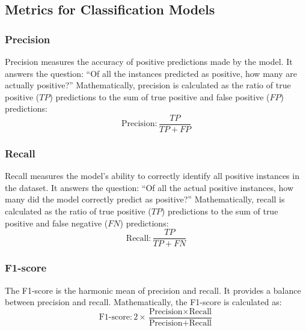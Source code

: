 \subsection{Metrics for Classification Models}

\subsubsection{Precision}
Precision measures the accuracy of positive predictions made by the model. It answers the question: ``Of all the instances predicted as positive, how many are actually positive?'' Mathematically, precision is calculated as the ratio of true positive (\(TP\)) predictions to the sum of true positive and false positive (\(FP\)) predictions:
\[
\text{Precision}:  \frac{TP}{TP + FP}
\]

\subsubsection{Recall}
Recall measures the model's ability to correctly identify all positive instances in the dataset. It answers the question: ``Of all the actual positive instances, how many did the model correctly predict as positive?'' Mathematically, recall is calculated as the ratio of true positive (\(TP\)) predictions to the sum of true positive and false negative (\(FN\)) predictions:
\[
\text{Recall}:  \frac{TP}{TP + FN}
\]

\subsubsection{F1-score}
The F1-score is the harmonic mean of precision and recall. It provides a balance between precision and recall. Mathematically, the F1-score is calculated as:
\[
\text{F1-score}: 2 \times \frac{\text{Precision} \times \text{Recall}}{\text{Precision} + \text{Recall}}
\]
